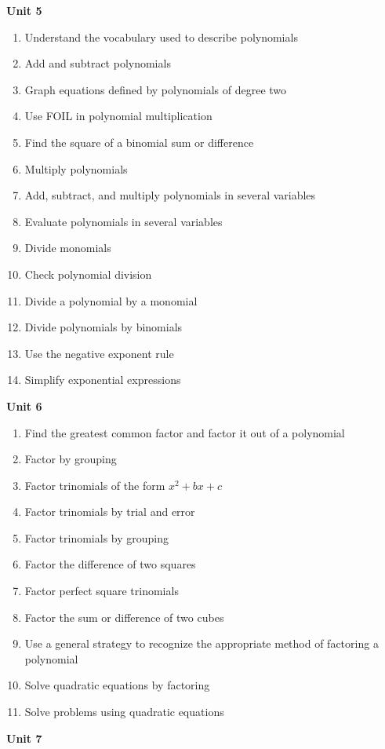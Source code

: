\documentclass[11pt]{article}
\newenvironment{alphalist}{
\begin{enumerate}[label=(\arabic*),widest=107 ,leftmargin=25pt, itemsep=0pt]}
{\end{enumerate}}
\begin{document}
\noindent \textbf{Unit  5}
 \begin{alphalist}
    \item Understand the vocabulary used to describe polynomials
    \item Add and subtract polynomials
    \item Graph equations defined by polynomials of degree two
    \item Use FOIL in polynomial multiplication
    \item Find the square of a binomial sum or difference
    \item Multiply polynomials
    \item Add, subtract, and multiply polynomials in several variables
    \item Evaluate polynomials in several variables
    \item Divide monomials
    \item Check polynomial division
    \item Divide a polynomial by a monomial 
    \item Divide polynomials by binomials
    \item Use the negative exponent rule
    \item Simplify exponential expressions
 \end{alphalist}
\noindent \textbf{Unit 6}
 \begin{alphalist}
    \item Find the greatest common factor and factor it out of a polynomial
    \item Factor by grouping
    \item Factor trinomials of the form $x^2 + bx + c$
    \item Factor trinomials by trial and error
    \item Factor trinomials by grouping
    \item Factor the difference of two squares
    \item Factor perfect square trinomials
    \item Factor the sum or difference of two cubes
    \item Use a general strategy to recognize the appropriate method of factoring a polynomial
    \item Solve quadratic equations by factoring
    \item Solve problems using quadratic equations
 \end{alphalist}
\noindent \textbf{Unit 7}
\end{document}
